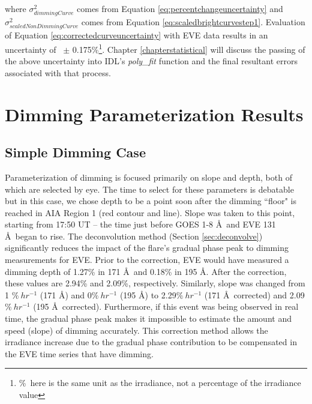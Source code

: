 \noindent where $\sigma^2_{dimmingCurve}$ comes from Equation \ref{eq:percentchangeuncertainty} and $\sigma^2_{scaledNonDimmingCurve}$ comes from Equation \ref{eq:scaledbrightcurvestep1}. Evaluation of Equation \ref{eq:correctedcurveuncertainty} with EVE data results in an uncertainty of ~$\pm$ 0.175\%\footnote{\%\ here is the same unit as the irradiance, not a percentage of the irradiance value}. Chapter \ref{chapterstatistical} will discuss the passing of the above uncertainty into IDL's \textit{poly{\_}fit} function and the final resultant errors associated with that process. 

\section{Dimming Parameterization Results}
\label{sec:casestudyresults}

\subsection{Simple Dimming Case}
Parameterization of dimming is focused primarily on slope and depth, both of which are selected by eye. The time to select for these parameters is debatable but in this case, we chose depth to be a point soon after the dimming ``floor" is reached in AIA Region 1 (red contour and line). Slope was taken to this point, starting from 17:50 UT -- the time just before GOES 1-8 \AA\ and EVE 131 \AA\ began to rise. The deconvolution method (Section \ref{sec:deconvolve}) significantly reduces the impact of the flare’s gradual phase peak to dimming measurements for EVE. Prior to the correction, EVE would have measured a dimming depth of 1.27\% in 171 \AA\ and 0.18\% in 195 \AA. After the correction, these values are 2.94\% and 2.09\%, respectively. Similarly, slope was changed from 1 $\%\ hr^{-1}$ (171 \AA) and 0$\%\ hr^{-1}$ (195 Å) to 2.29$\%\ hr^{-1}$ (171 \AA\ corrected) and 2.09$\%\ hr^{-1}$ (195 \AA\ corrected). Furthermore, if this event was being observed in real time, the gradual phase peak makes it impossible to estimate the amount and speed (slope) of dimming accurately. This correction method allows the irradiance increase due to the gradual phase contribution to be compensated in the EVE time series that have dimming.

